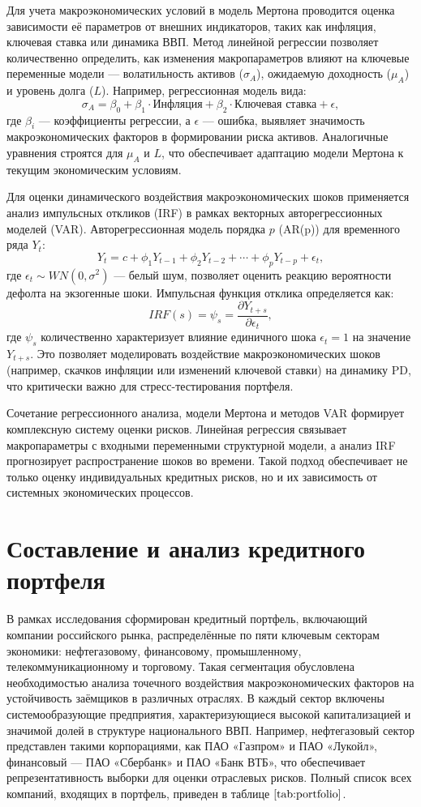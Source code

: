 \documentclass[]{article}
\begin{document}
	Для учета макроэкономических условий в модель Мертона проводится оценка зависимости её параметров от внешних индикаторов, таких как инфляция, ключевая ставка или динамика ВВП. Метод линейной регрессии позволяет количественно определить, как изменения макропараметров влияют на ключевые переменные модели — волатильность активов (\(\sigma_A\)), ожидаемую доходность (\(\mu_A\)) и уровень долга (\(L\)). Например, регрессионная модель вида:  
	\[
	\sigma_A = \beta_0 + \beta_1 \cdot \text{Инфляция} + \beta_2 \cdot \text{Ключевая\ ставка} + \epsilon,
	\]  
	где \(\beta_i\) — коэффициенты регрессии, а \(\epsilon\) — ошибка, выявляет значимость макроэкономических факторов в формировании риска активов. Аналогичные уравнения строятся для \(\mu_A\) и \(L\), что обеспечивает адаптацию модели Мертона к текущим экономическим условиям.  
	
	Для оценки динамического воздействия макроэкономических шоков применяется анализ импульсных откликов (IRF) в рамках векторных авторегрессионных моделей (VAR). Авторегрессионная модель порядка \(p\) (AR(p)) для временного ряда \(Y_t\):  
	\[
	Y_t = c + \phi_1 Y_{t-1} + \phi_2 Y_{t-2} + \cdots + \phi_p Y_{t-p} + \epsilon_t,
	\]  
	где \(\epsilon_t \sim WN(0, \sigma^2)\) — белый шум, позволяет оценить реакцию вероятности дефолта на экзогенные шоки. Импульсная функция отклика определяется как:  
	\[
	IRF(s) = \psi_s = \frac{\partial Y_{t+s}}{\partial \epsilon_t},
	\]  
	где \(\psi_s\) количественно характеризует влияние единичного шока \(\epsilon_t = 1\) на значение \(Y_{t+s}\). Это позволяет моделировать воздействие макроэкономических шоков (например, скачков инфляции или изменений ключевой ставки) на динамику PD, что критически важно для стресс-тестирования портфеля.  
	
	Сочетание регрессионного анализа, модели Мертона и методов VAR формирует комплексную систему оценки рисков. Линейная регрессия связывает макропараметры с входными переменными структурной модели, а анализ IRF прогнозирует распространение шоков во времени. Такой подход обеспечивает не только оценку индивидуальных кредитных рисков, но и их зависимость от системных экономических процессов.
	
	
	\section{Составление и анализ кредитного портфеля}
	
	В рамках исследования сформирован кредитный портфель, включающий компании российского рынка, распределённые по пяти ключевым секторам экономики: нефтегазовому, финансовому, промышленному, телекоммуникационному и торговому. Такая сегментация обусловлена необходимостью анализа точечного воздействия макроэкономических факторов на устойчивость заёмщиков в различных отраслях. В каждый сектор включены системообразующие предприятия, характеризующиеся высокой капитализацией и значимой долей в структуре национального ВВП. Например, нефтегазовый сектор представлен такими корпорациями, как ПАО «Газпром» и ПАО «Лукойл», финансовый — ПАО «Сбербанк» и ПАО «Банк ВТБ», что обеспечивает репрезентативность выборки для оценки отраслевых рисков. Полный список всех компаний, входящих в портфель, приведен в таблице $\ref{tab:portfolio}$.
	
\end{document}

